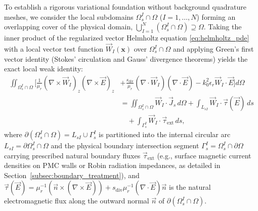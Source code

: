 \documentclass[preprint,12pt]{elsarticle}
\begin{document}
To establish a rigorous variational foundation without background quadrature meshes, we consider the local subdomains $\Omega_s^I \cap \Omega$ ($I = 1, \dots, N$) forming an overlapping cover of the physical domain, $\bigcup_{I=1}^N (\Omega_s^I \cap \Omega) \supseteq \Omega$. Taking the inner product of the regularized vector Helmholtz equation \eqref{eq:helmholtz_pde} with a local vector test function $\vec{W}_I(\mathbf{x})$ over $\Omega_s^I \cap \Omega$ and applying Green's first vector identity (Stokes' circulation and Gauss' divergence theorems) yields the exact local weak identity:
\begin{equation}
    \begin{aligned}
        \iint_{\Omega_s^I \cap \Omega} \bigg[ \frac{1}{\mu_r} (\nabla \times \vec{W}_I)_z (\nabla \times \vec{E})_z & + \frac{s_{\mathrm{div}}}{\mu_r} (\nabla \cdot \vec{W}_I) (\nabla \cdot \vec{E}) - k_0^2 \epsilon_r \vec{W}_I \cdot \vec{E} \bigg] d\Omega \\
                                                                                                                    & = \iint_{\Omega_s^I \cap \Omega} \vec{W}_I \cdot \vec{J}_s \, d\Omega + \int_{L_{sI}} \vec{W}_I \cdot \vec{\tau}(\vec{E}) \, ds \\
                                                                                                                    & \quad + \int_{\Gamma_s^I} \vec{W}_I \cdot \vec{\tau}_{\mathrm{ext}} \, ds,
    \end{aligned}
    \label{eq:local_weak_form}
\end{equation}
where $\partial(\Omega_s^I \cap \Omega) = L_{sI} \cup \Gamma_s^I$ is partitioned into the internal circular arc $L_{sI} = \partial\Omega_s^I \cap \Omega$ and the physical boundary intersection segment $\Gamma_s^I = \Omega_s^I \cap \partial\Omega$ carrying prescribed natural boundary fluxes $\vec{\tau}_{\mathrm{ext}}$ (e.g., surface magnetic current densities on PMC walls or Robin radiation impedances, as detailed in Section~\ref{subsec:boundary_treatment}), and $\vec{\tau}(\vec{E}) = \mu_r^{-1}(\vec{n} \times (\nabla \times \vec{E})) + s_{\mathrm{div}}\mu_r^{-1}(\nabla \cdot \vec{E})\vec{n}$ is the natural electromagnetic flux along the outward normal $\vec{n}$ of $\partial(\Omega_s^I \cap \Omega)$.
\end{document}
